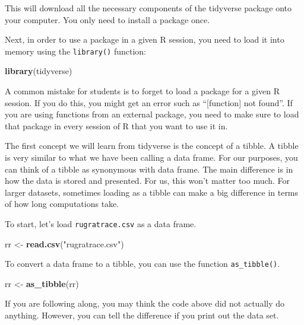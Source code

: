 \documentclass[
]{book}
\newenvironment{Shaded}{\begin{snugshade}}{\end{snugshade}}
\newcommand{\FunctionTok}[1]{\textcolor[rgb]{0.13,0.29,0.53}{\textbf{#1}}}
\newcommand{\NormalTok}[1]{#1}
\newcommand{\OtherTok}[1]{\textcolor[rgb]{0.56,0.35,0.01}{#1}}
\newcommand{\StringTok}[1]{\textcolor[rgb]{0.31,0.60,0.02}{#1}}
\begin{document}
This will download all the necessary components of the tidyverse package onto your computer. You only need to install a package once.

Next, in order to use a package in a given R session, you need to load it into memory using the \texttt{library()} function:

\begin{Shaded}
\begin{Highlighting}[]
\FunctionTok{library}\NormalTok{(tidyverse)}
\end{Highlighting}
\end{Shaded}

A common mistake for students is to forget to load a package for a given R session. If you do this, you might get an error such as ``{[}function{]} not found''. If you are using functions from an external package, you need to make sure to load that package in every session of R that you want to use it in.

The first concept we will learn from tidyverse is the concept of a tibble. A tibble is very similar to what we have been calling a data frame. For our purposes, you can think of a tibble as synonymous with data frame. The main difference is in how the data is stored and presented. For us, this won't matter too much. For larger datasets, sometimes loading as a tibble can make a big difference in terms of how long computations take.

To start, let's load \texttt{rugratrace.csv} as a data frame.

\begin{Shaded}
\begin{Highlighting}[]
\NormalTok{rr }\OtherTok{\textless{}{-}} \FunctionTok{read.csv}\NormalTok{(}\StringTok{"rugratrace.csv"}\NormalTok{)}
\end{Highlighting}
\end{Shaded}

To convert a data frame to a tibble, you can use the function \texttt{as\_tibble()}.

\begin{Shaded}
\begin{Highlighting}[]
\NormalTok{rr }\OtherTok{\textless{}{-}} \FunctionTok{as\_tibble}\NormalTok{(rr)}
\end{Highlighting}
\end{Shaded}

If you are following along, you may think the code above did not actually do anything. However, you can tell the difference if you print out the data set.
\end{document}
